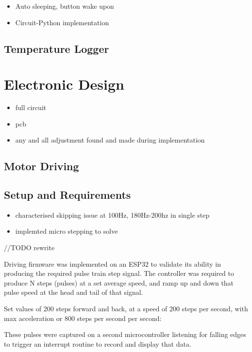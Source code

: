 \begin{itemize}
    \item Auto sleeping, button wake upon
    \item Circuit-Python implementation
\end{itemize}

\subsection{Temperature Logger}

\section{Electronic Design}

\begin{itemize}
    \item full circuit
    \item pcb
    \item any and all adjustment found and made during implementation
\end{itemize}

\subsection{Motor Driving}

\subsection{Setup and Requirements}

\begin{itemize}
    \item characterised skipping issue at 100Hz, 180Hz-200hz in single step
    \item implemted micro stepping to solve
\end{itemize}

//TODO rewrite

Driving firmware was implemented on an ESP32 to validate its ability in producing the required pulse train step signal. The controller was required to produce N steps (pulses) at a set average speed, and ramp up and down that pulse speed at the head and tail of that signal.

Set values of 200 steps forward and back, at a speed of 200 steps per second, with max acceleration or 800 steps per second per second:

These pulses were captured on a second microcontroller listening for falling edges to trigger an interrupt routine to record and display that data.

